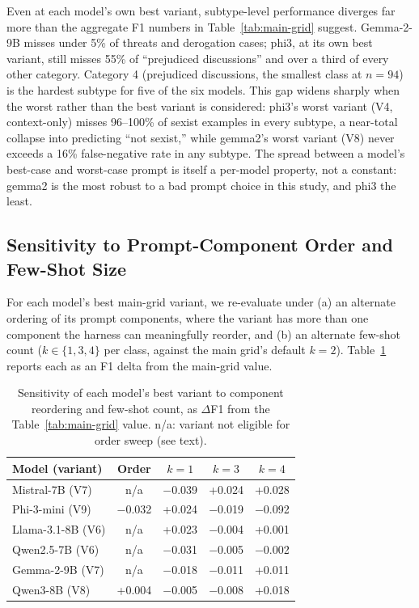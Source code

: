 Even at each model's own best variant, subtype-level performance
diverges far more than the aggregate F1 numbers in
Table~\ref{tab:main-grid} suggest. Gemma-2-9B misses under 5\% of
threats and derogation cases; phi3, at its own best variant, still
misses 55\% of ``prejudiced discussions'' and over a third of every
other category. Category 4 (prejudiced discussions, the smallest class
at $n=94$) is the hardest subtype for five of the six models. This
gap widens sharply when the worst rather than the best variant is
considered: phi3's worst variant (V4, context-only) misses 96--100\% of
sexist examples in every subtype, a near-total collapse into
predicting ``not sexist,'' while gemma2's worst variant (V8) never
exceeds a 16\% false-negative rate in any subtype. The spread between a
model's best-case and worst-case prompt is itself a per-model property,
not a constant: gemma2 is the most robust to a bad prompt choice in this
study, and phi3 the least.

\subsection{Sensitivity to Prompt-Component Order and Few-Shot Size}
\label{sec:results:sensitivity}

For each model's best main-grid variant, we re-evaluate under (a) an
alternate ordering of its prompt components, where the variant has more
than one component the harness can meaningfully reorder, and (b) an
alternate few-shot count ($k \in \{1,3,4\}$ per class, against the
main grid's default $k=2$). Table~\ref{tab:sensitivity} reports each as
an F1 delta from the main-grid value.

\begin{table}[t]
\centering
\footnotesize
\caption{Sensitivity of each model's best variant to component reordering
and few-shot count, as $\Delta$F1 from the Table~\ref{tab:main-grid}
value. n/a: variant not eligible for order sweep (see text).}
\label{tab:sensitivity}
\begin{tabular}{lcccc}
\toprule
Model (variant) & Order & $k{=}1$ & $k{=}3$ & $k{=}4$ \\
\midrule
Mistral-7B (V7) & n/a & $-$0.039 & +0.024 & +0.028 \\
Phi-3-mini (V9) & $-$0.032 & +0.024 & $-$0.019 & $-$0.092 \\
Llama-3.1-8B (V6) & n/a & +0.023 & $-$0.004 & +0.001 \\
Qwen2.5-7B (V6) & n/a & $-$0.031 & $-$0.005 & $-$0.002 \\
Gemma-2-9B (V7) & n/a & $-$0.018 & $-$0.011 & +0.011 \\
Qwen3-8B (V8) & +0.004 & $-$0.005 & $-$0.008 & +0.018 \\
\bottomrule
\end{tabular}
\end{table}

